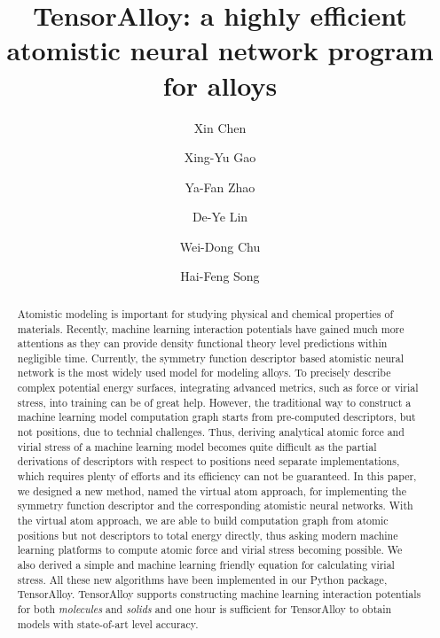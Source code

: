 \documentclass[preprint]{revtex4-2}
\begin{document}
\title{
    TensorAlloy: a highly efficient atomistic neural network program for alloys
}
\author{Xin Chen}
\author{Xing-Yu Gao}
\author{Ya-Fan Zhao}
\author{De-Ye Lin}
\author{Wei-Dong Chu}
\author{Hai-Feng Song}


\begin{abstract}
Atomistic modeling is important for studying physical and chemical properties of
materials. Recently, machine learning interaction potentials have gained much 
more attentions as they can provide density functional theory level predictions 
within negligible time. Currently, the symmetry function descriptor based 
atomistic neural network is the most widely used model for modeling alloys. 
To precisely describe complex potential energy surfaces, integrating advanced 
metrics, such as force or virial stress, into training can be of great help. 
However, the traditional way to construct a 
machine learning model computation graph starts from pre-computed descriptors, 
but not positions, due to technial challenges. Thus, deriving analytical atomic 
force and virial stress of a machine learning model becomes quite difficult as 
the partial derivations of descriptors with respect to positions need separate 
implementations, which requires plenty of efforts and its efficiency can not be 
guaranteed.
In this paper, we designed a new method, named the virtual atom approach, for 
implementing the symmetry function descriptor and the corresponding atomistic 
neural networks. With the virtual atom approach, we are able to build 
computation graph from atomic positions \textemdash but not descriptors 
\textemdash to total energy directly, thus asking modern machine learning 
platforms to compute atomic force and virial stress becoming possible. We also 
derived a simple and machine learning friendly equation for calculating virial 
stress. All these new algorithms have been implemented in our Python package, 
TensorAlloy. TensorAlloy supports constructing machine learning interaction 
potentials for both \textit{molecules} and \textit{solids} and one hour is 
sufficient for TensorAlloy to obtain models with state-of-art level accuracy.
\end{abstract}

\maketitle
\end{document}
